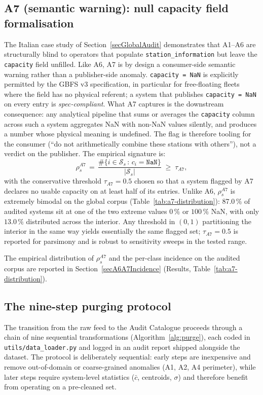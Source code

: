 \documentclass[11pt,a4paper]{article}
\begin{document}
\subsection{A7 (semantic warning): null capacity field formalisation}\label{secA7Formalisation}
The Italian case study of Section~\ref{secGlobalAudit} demonstrates
that A1--A6 are structurally blind to operators that populate
\texttt{station\_information} but leave the \texttt{capacity} field
unfilled. Like A6, A7 is by design a consumer-side
semantic warning rather than a publisher-side anomaly. \texttt{capacity = NaN} is
explicitly permitted by the GBFS v3 specification, in particular
for free-floating fleets where the field has no physical referent;
a system that publishes \texttt{capacity = NaN} on every entry is
\emph{spec-compliant}. What A7 captures is the downstream
consequence: any analytical pipeline that sums or averages the
\texttt{capacity} column across such a system aggregates NaN with
non-NaN values silently, and produces a number whose physical
meaning is undefined. The flag is therefore tooling for the
consumer (``do not arithmetically combine these stations with
others''), not a verdict on the publisher. The empirical signature
is:
\begin{equation}
\rho_s^{A7} \,=\,
\frac{\#\{i \in \mathcal{S}_s \,:\, c_i = \mathtt{NaN}\}}{|\mathcal{S}_s|}
\;\geq\; \tau_{A7},
\end{equation}
with the conservative threshold $\tau_{A7} = 0.5$ chosen so that a
system flagged by A7 declares no usable capacity on at least half
of its entries. Unlike A6, $\rho_s^{A7}$ is extremely bimodal on
the global corpus
(Table~\ref{tab:a7-distribution}): 87.0\,\% of audited
systems sit at one of the two extreme values $0\,\%$ or $100\,\%$
NaN, with only $13.0\,\%$ distributed across the interior. Any
threshold in $(0, 1)$ partitioning the interior in the same way
yields essentially the same flagged set; $\tau_{A7} = 0.5$ is
reported for parsimony and is robust to sensitivity sweeps in the
tested range.

The empirical distribution of $\rho_s^{A7}$ and the
per-class incidence on the audited corpus are reported in
Section~\ref{secA6A7Incidence} (Results,
Table~\ref{tab:a7-distribution}).

\subsection{The nine-step purging protocol}\label{secProtocol}
The transition from the raw feed to the Audit Catalogue proceeds through
a chain of nine sequential transformations (Algorithm~\ref{alg:purge}),
each coded in \texttt{utils/data\_loader.py} and logged in an audit
report shipped alongside the dataset. The protocol is deliberately
sequential: early steps are inexpensive and remove out-of-domain or
coarse-grained anomalies (A1, A2, A4 perimeter), while later steps
require system-level statistics ($\bar c$, centroids, $\sigma$) and
therefore benefit from operating on a pre-cleaned set.
\end{document}
